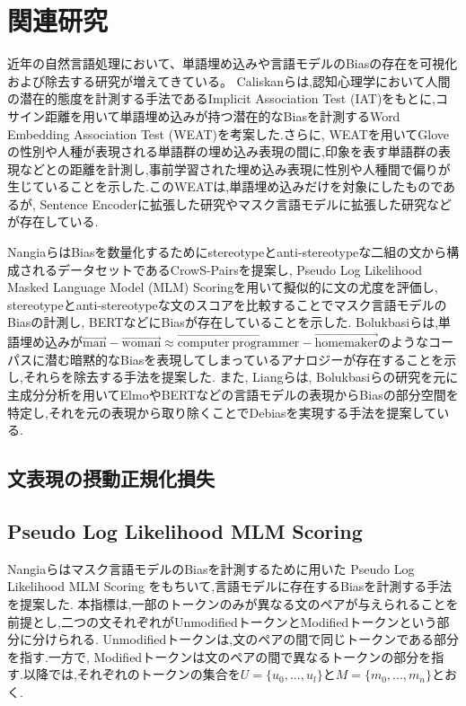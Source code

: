 \documentclass[
  platex, dvipdfmx %
]{nlp2021}
\begin{document}
\section{関連研究}
近年の自然言語処理において、単語埋め込みや言語モデルのBiasの存在を可視化および除去する研究が増えてきている。
Caliskanら\cite{caliskan2017}は,認知心理学において人間の潜在的態度を計測する手法であるImplicit Association Test (IAT)\cite{Greenwald98measuringindividual}をもとに,コサイン距離を用いて単語埋め込みが持つ潜在的なBiasを計測するWord Embedding Association Test (WEAT)を考案した.さらに, WEATを用いてGlove\cite{pennington2014glove}の性別や人種が表現される単語群の埋め込み表現の間に,印象を表す単語群の表現などとの距離を計測し,事前学習された埋め込み表現に性別や人種間で偏りが生じていることを示した.このWEATは,単語埋め込みだけを対象にしたものであるが, Sentence Encoderに拡張した研究\cite{may-etal-2019-measuring}やマスク言語モデルに拡張した研究\cite{kurita2019measuring}などが存在している.

Nangiaら\cite{nangia2020crows}はBiasを数量化するためにstereotypeとanti-stereotypeな二組の文から構成されるデータセットであるCrowS-Pairsを提案し, Pseudo Log Likelihood Masked Language Model (MLM) Scoring\cite{salazar-etal-2020-masked}を用いて擬似的に文の尤度を評価し,  stereotypeとanti-stereotypeな文のスコアを比較することでマスク言語モデルのBiasの計測し, BERTなどにBiasが存在していることを示した.
Bolukbasiら\cite{bolukbasi2016man}は,単語埋め込みが$\overrightarrow{\mathrm{man}}-\overrightarrow{\mathrm{woman}} \approx \overrightarrow{\mathrm{computer\ programmer}}-\overrightarrow{\mathrm{homemaker}}$のようなコーパスに潜む暗黙的なBiasを表現してしまっているアナロジーが存在することを示し,それらを除去する手法を提案した.
また, Liangら\cite{liang-etal-2020-towards}は, Bolukbasiらの研究を元に主成分分析を用いてElmoやBERTなどの言語モデルの表現からBiasの部分空間を特定し,それを元の表現から取り除くことでDebiasを実現する手法を提案している.

\subsection{文表現の摂動正規化損失}

\subsection{Pseudo Log Likelihood MLM Scoring}
Nangiaら\cite{nangia2020crows}はマスク言語モデルのBiasを計測するために用いた Pseudo Log Likelihood MLM Scoring \cite{salazar-etal-2020-masked}をもちいて,言語モデルに存在するBiasを計測する手法を提案した.
本指標は,一部のトークンのみが異なる文のペアが与えられることを前提とし,二つの文それぞれがUnmodifiedトークンとModifiedトークンという部分に分けられる. Unmodifiedトークンは,文のペアの間で同じトークンである部分を指す.一方で, Modifiedトークンは文のペアの間で異なるトークンの部分を指す.以降では,それぞれのトークンの集合を$U = \{u_0, ..., u_l\}$と$M = \{m_0, ..., m_n\}$とおく.
\end{document}
